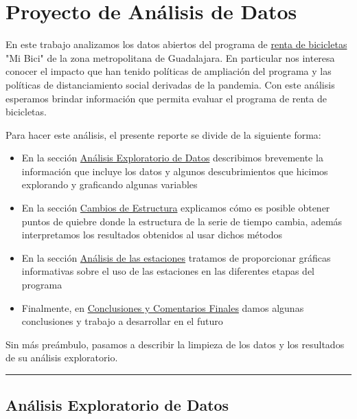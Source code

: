 \documentclass[
]{article}
\author{}
\date{}
\begin{document}
\hypertarget{proyecto-de-anuxe1lisis-de-datos}{%
\section{Proyecto de Análisis de
Datos}\label{proyecto-de-anuxe1lisis-de-datos}}

En este trabajo analizamos los datos abiertos del programa de
\href{https://mibici.net}{renta de bicicletas} "Mi Bici" de la zona
metropolitana de Guadalajara. En particular nos interesa conocer el
impacto que han tenido políticas de ampliación del programa y las
políticas de distanciamiento social derivadas de la pandemia. Con este
análisis esperamos brindar información que permita evaluar el programa
de renta de bicicletas.

Para hacer este análisis, el presente reporte se divide de la siguiente
forma:

\begin{itemize}
\item
  En la sección
  \protect\hyperlink{anuxe1lisis-exploratorio-de-datos}{Análisis
  Exploratorio de Datos} describimos brevemente la información que
  incluye los datos y algunos descubrimientos que hicimos explorando y
  graficando algunas variables
\item
  En la sección \protect\hyperlink{cambios-de-estructura}{Cambios de
  Estructura} explicamos cómo es posible obtener puntos de quiebre donde
  la estructura de la serie de tiempo cambia, además interpretamos los
  resultados obtenidos al usar dichos métodos
\item
  En la sección
  \protect\hyperlink{anuxe1lisis-de-las-estaciones}{Análisis de las
  estaciones} tratamos de proporcionar gráficas informativas sobre el
  uso de las estaciones en las diferentes etapas del programa
\item
  Finalmente, en
  \protect\hyperlink{conclusiones-y-comentarios-finales}{Conclusiones y
  Comentarios Finales} damos algunas conclusiones y trabajo a
  desarrollar en el futuro
\end{itemize}

Sin más preámbulo, pasamos a describir la limpieza de los datos y los
resultados de su análisis exploratorio.

\begin{center}\rule{0.5\linewidth}{0.5pt}\end{center}

\hypertarget{anuxe1lisis-exploratorio-de-datos}{%
\subsection{Análisis Exploratorio de
Datos}\label{anuxe1lisis-exploratorio-de-datos}}
\end{document}
